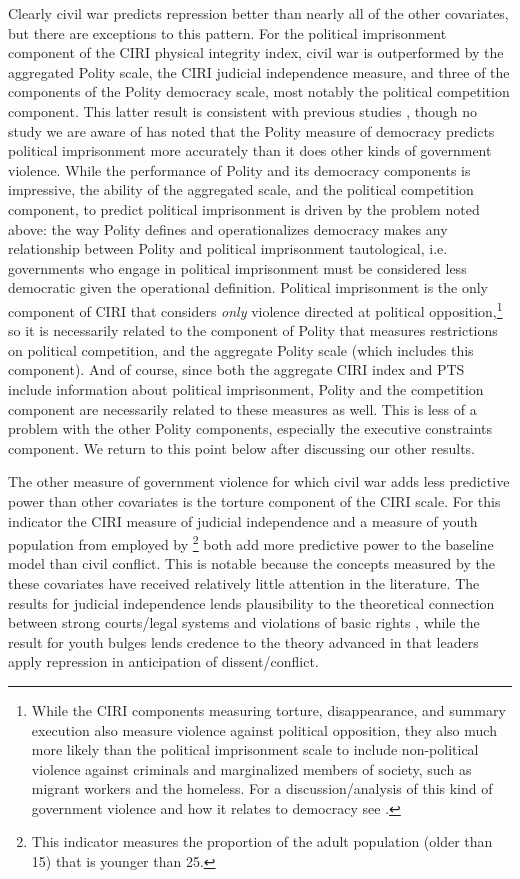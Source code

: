 \documentclass[11pt]{article}
\begin{document}
Clearly civil war predicts repression better than nearly all of the other covariates, but there are exceptions to this pattern. For the political imprisonment component of the CIRI physical integrity index, civil war is outperformed by the aggregated Polity scale, the CIRI judicial independence measure, and three of the components of the Polity democracy scale, most notably the political competition component. This latter result is consistent with previous studies \citep{Keith2002PRQ,BDMetal2005}, though no study we are aware of has noted that the Polity measure of democracy predicts political imprisonment more accurately than it does other kinds of government violence. While the performance of Polity and its democracy components is impressive, the ability of the aggregated scale, and the political competition component, to predict political imprisonment is driven by the problem noted above: the way Polity defines and operationalizes democracy makes any relationship between Polity and political imprisonment tautological, i.e. governments who engage in political imprisonment must be considered less democratic given the operational definition. Political imprisonment is the only component of CIRI that considers {\em only} violence directed at political opposition,\footnote{While the CIRI components measuring torture, disappearance, and summary execution also measure violence against political opposition, they also much more likely than the political imprisonment scale to include non-political violence against criminals and marginalized members of society, such as migrant workers and the homeless. For a discussion/analysis of this kind of government violence and how it relates to democracy see \citet{Haschke2011}.} so it is necessarily related to the component of Polity that measures restrictions on political competition, and the aggregate Polity scale (which includes this component). And of course, since both the aggregate CIRI index and PTS include information about political imprisonment, Polity and the competition component are necessarily related to these measures as well. This is less of a problem with the other Polity components, especially the executive constraints component. 
We return to this point below after discussing our other results.

The other measure of government violence for which civil war adds less predictive power than other covariates is the torture component of the CIRI scale. For this indicator the CIRI measure of judicial independence and a measure of youth population from \citet{Urdal2006} employed by \citet{NordasDavenport2013}\footnote{This indicator measures the proportion of the adult population (older than 15) that is younger than 25.} both add more predictive power to the baseline model than civil conflict. This is notable because the concepts measured by the these covariates have received relatively little attention in the literature. The results for judicial independence lends plausibility to the theoretical connection between strong courts/legal systems and violations of basic rights \citep[E.g.,][]{NorthWeingast1989}, while the result for youth bulges lends credence to the theory advanced in \citet{NordasDavenport2013} that leaders apply repression in anticipation of dissent/conflict. 
\end{document}
